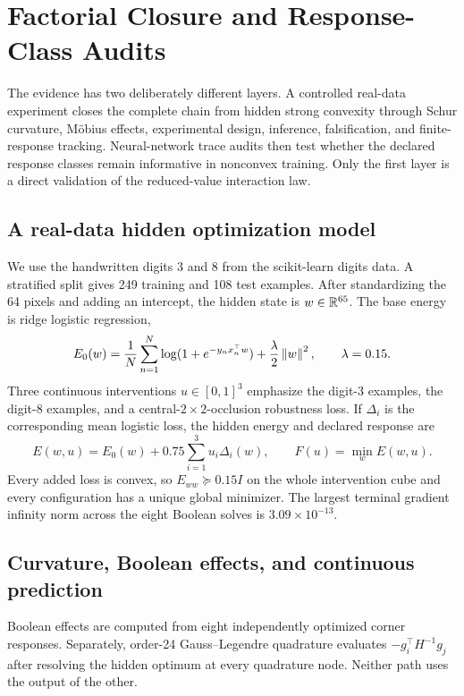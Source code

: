 \section{Factorial Closure and Response-Class Audits}
\label{sec:experiments}

The evidence has two deliberately different layers.  A controlled real-data
experiment closes the complete chain from hidden strong convexity through
Schur curvature, M\"obius effects, experimental design, inference,
falsification, and finite-response tracking.  Neural-network trace audits then
test whether the declared response classes remain informative in nonconvex
training.  Only the first layer is a direct validation of the
reduced-value interaction law.

\subsection{A real-data hidden optimization model}

We use the handwritten digits 3 and 8 from the scikit-learn digits data.  A
stratified split gives 249 training and 108 test examples.  After standardizing
the 64 pixels and adding an intercept, the hidden state is
$w\in\mathbb R^{65}$.  The base energy is ridge logistic regression,
\[
E_0(w)=\frac1N\sum_{n=1}^N
\log(1+e^{-y_nx_n^\top w})+\frac{\lambda}{2}\left\lVert w\right\rVert^2,
\qquad \lambda=0.15.
\]
Three continuous interventions $u\in[0,1]^3$ emphasize the digit-3 examples,
the digit-8 examples, and a central-$2\times2$-occlusion robustness loss.  If
$\Delta_i$ is the corresponding mean logistic loss, the hidden energy and
declared response are
\begin{equation}
E(w,u)=E_0(w)+0.75\sum_{i=1}^3u_i\Delta_i(w),
\qquad
F(u)=\min_w E(w,u).
\label{eq:digits-hidden-energy}
\end{equation}
Every added loss is convex, so $E_{ww}\succeq0.15I$ on the whole intervention
cube and every configuration has a unique global minimizer.  The largest
terminal gradient infinity norm across the eight Boolean solves is
$3.09\times10^{-13}$.

\subsection{Curvature, Boolean effects, and continuous prediction}

Boolean effects are computed from eight independently optimized corner
responses.  Separately, order-24 Gauss--Legendre quadrature evaluates
$-g_i^\top H^{-1}g_j$ after resolving the hidden optimum at every quadrature
node.  Neither path uses the output of the other.


